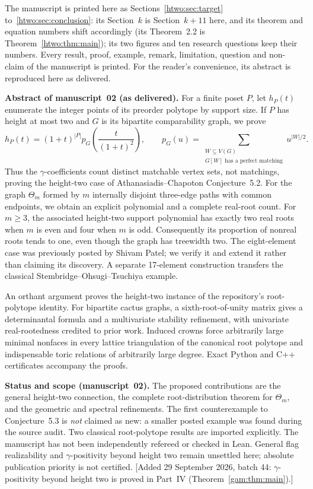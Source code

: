 \documentclass[11pt]{article}
\numberwithin{equation}{section}
\theoremstyle{definition}
\begin{document}
The manuscript is printed here as Sections~\ref{htwo:sec:target}
to~\ref{htwo:sec:conclusion}: its Section~$k$ is Section~$k+11$ here, and its
theorem and equation numbers shift accordingly (its Theorem~2.2 is
Theorem~\ref{htwo:thm:main}); its two figures and ten research questions
keep their numbers.
Every result, proof, example, remark, limitation, question and non-claim of
the manuscript is printed. For the reader's convenience, its abstract is
reproduced here as delivered.

\begin{tcolorbox}[colback=white,colframe=Pale,arc=1mm]
\small\textbf{Abstract of manuscript~02 (as delivered).}
For a finite poset $P$, let $h_P(t)$ enumerate the integer points of
its preorder polytope by support size. If $P$ has height at most two and $G$ is
its bipartite comparability graph, we prove
\[
 h_P(t)=(1+t)^{|P|}p_G\!\left(\frac{t}{(1+t)^2}\right),
 \qquad
 p_G(u)=\sum_{\substack{W\subseteq V(G)\\G[W]\text{ has a perfect matching}}}
 u^{|W|/2}.
\]
Thus the $\gamma$-coefficients count distinct matchable vertex sets, not
matchings, proving the height-two case of Athanasiadis--Chapoton
Conjecture~5.2. For the graph $\Theta_m$ formed by $m$ internally disjoint
three-edge paths with common endpoints, we obtain an explicit polynomial
and a complete real-root count. For $m\ge3$, the associated height-two
support polynomial has exactly two real roots when $m$ is even and four
when $m$ is odd. Consequently its proportion of nonreal roots tends to
one, even though the graph has treewidth two. The eight-element case was
previously posted by Shivam Patel; we verify it and extend it rather than
claiming its discovery. A separate 17-element construction transfers the
classical Stembridge--Ohsugi--Tsuchiya example.

An orthant argument proves the height-two instance of the repository's
root-polytope identity. For bipartite cactus graphs, a sixth-root-of-unity
matrix gives a determinantal formula and a multivariate stability
refinement, with univariate real-rootedness credited to prior work.
Induced crowns force arbitrarily large minimal nonfaces in every lattice
triangulation of the canonical root polytope and indispensable toric
relations of arbitrarily large degree. Exact Python and C++ certificates
accompany the proofs.
\end{tcolorbox}

\begin{statusbox}
\small\textbf{Status and scope (manuscript~02).} The proposed contributions are the general
height-two connection, the complete root-distribution theorem for
$\Theta_m$, and the geometric and spectral refinements. The first
counterexample to Conjecture~5.3 is \emph{not} claimed as new: a smaller
posted example was found during the source audit. Two classical
root-polytope results are imported explicitly. The manuscript has not been
independently refereed or checked in Lean. General flag realizability and
$\gamma$-positivity beyond height two remain unsettled here; absolute
publication priority is not certified.
[Added 29 September 2026, batch 44: $\gamma$-positivity beyond height two is
proved in Part~IV (Theorem~\ref{gam:thm:main}).]
\end{statusbox}
\end{document}

